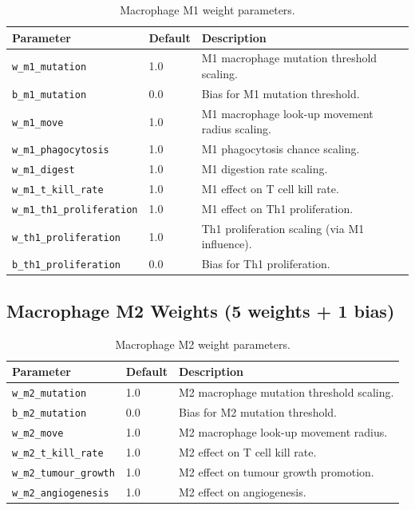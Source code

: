 \begin{table}[H]
\centering
\caption{Macrophage M1 weight parameters.}
\label{tab:m1-weights}
\begin{tabular}{@{}llp{6cm}@{}}
\toprule
\textbf{Parameter} & \textbf{Default} & \textbf{Description} \\
\midrule
\texttt{w\_m1\_mutation} & 1.0 & M1 macrophage mutation threshold scaling. \\
\texttt{b\_m1\_mutation} & 0.0 & Bias for M1 mutation threshold. \\
\texttt{w\_m1\_move} & 1.0 & M1 macrophage look-up movement radius scaling. \\
\texttt{w\_m1\_phagocytosis} & 1.0 & M1 phagocytosis chance scaling. \\
\texttt{w\_m1\_digest} & 1.0 & M1 digestion rate scaling. \\
\texttt{w\_m1\_t\_kill\_rate} & 1.0 & M1 effect on T cell kill rate. \\
\texttt{w\_m1\_th1\_proliferation} & 1.0 & M1 effect on Th1 proliferation. \\
\texttt{w\_th1\_proliferation} & 1.0 & Th1 proliferation scaling (via M1 influence). \\
\texttt{b\_th1\_proliferation} & 0.0 & Bias for Th1 proliferation. \\
\bottomrule
\end{tabular}
\end{table}

\subsection{Macrophage M2 Weights (5 weights + 1 bias)}

\begin{table}[H]
\centering
\caption{Macrophage M2 weight parameters.}
\label{tab:m2-weights}
\begin{tabular}{@{}llp{6cm}@{}}
\toprule
\textbf{Parameter} & \textbf{Default} & \textbf{Description} \\
\midrule
\texttt{w\_m2\_mutation} & 1.0 & M2 macrophage mutation threshold scaling. \\
\texttt{b\_m2\_mutation} & 0.0 & Bias for M2 mutation threshold. \\
\texttt{w\_m2\_move} & 1.0 & M2 macrophage look-up movement radius. \\
\texttt{w\_m2\_t\_kill\_rate} & 1.0 & M2 effect on T cell kill rate. \\
\texttt{w\_m2\_tumour\_growth} & 1.0 & M2 effect on tumour growth promotion. \\
\texttt{w\_m2\_angiogenesis} & 1.0 & M2 effect on angiogenesis. \\
\bottomrule
\end{tabular}
\end{table}

